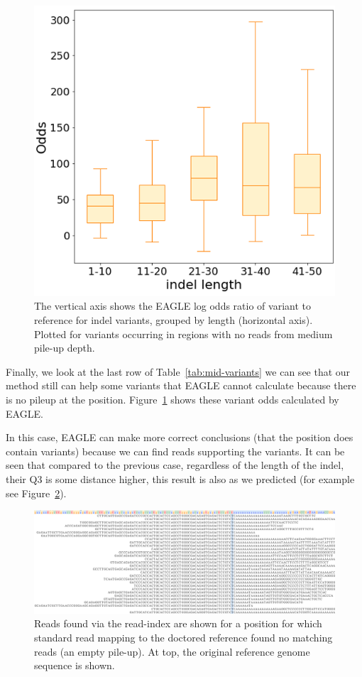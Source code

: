 \begin{figure}[H]
\centering
\includegraphics[width=0.6\columnwidth]{body/image/mid_new_odds.png}
\caption[no reads with variants from medium pile-up depth odds ratio]
{The vertical axis shows the EAGLE log odds ratio of variant to reference for indel variants, grouped by length (horizontal axis).  Plotted for variants occurring in regions with no reads from medium pile-up depth.}
\label{mid_new_odds}
\end{figure}


Finally, we look at the last row of Table~\ref{tab:mid-variants} we can see that our method still can help some variants that EAGLE cannot calculate because there is no pileup at the position. Figure~\ref{mid_new_odds} shows these variant odds calculated by EAGLE.

In this case, EAGLE can make more correct conclusions (that the position does contain variants) because we can find reads supporting the variants. It can be seen that compared to the previous case, regardless of the length of the indel, their Q3 is some distance higher, this result is also as we predicted (for example see Figure~\ref{mid_new_pileup}).


\begin{figure}[H]
\includegraphics[width=1\columnwidth]{body/image/mid_new_pileup.png}
\caption[find new pileup reads in medium pile-up read depth]
{Reads found via the read-index are shown for a position for which standard read mapping to the doctored reference found no matching reads (an empty pile-up).
At top, the original reference genome sequence is shown.}
\label{mid_new_pileup}
\end{figure}

